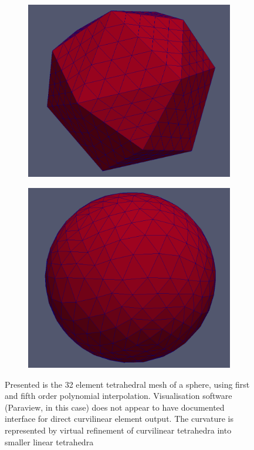 \begin{figure}
    \centering
	\begin{subfigure}[b]{0.48\textwidth} \hspace{8mm} \includegraphics[scale=0.215]{images/sphere32discr6ord1} \end{subfigure}
	\begin{subfigure}[b]{0.48\textwidth} \includegraphics[scale=0.2]{images/sphere32discr6ord5} \end{subfigure}
	\captionsetup{width=0.8\textwidth} 
	\caption{Presented is the 32 element tetrahedral mesh of a sphere, using first and fifth order polynomial interpolation. Visualisation software (Paraview, in this case) does not appear to have documented interface for direct curvilinear element output. The curvature is represented by virtual refinement of curvilinear tetrahedra into smaller linear tetrahedra }
	\label{fig:result:spherecurv}
\end{figure}

